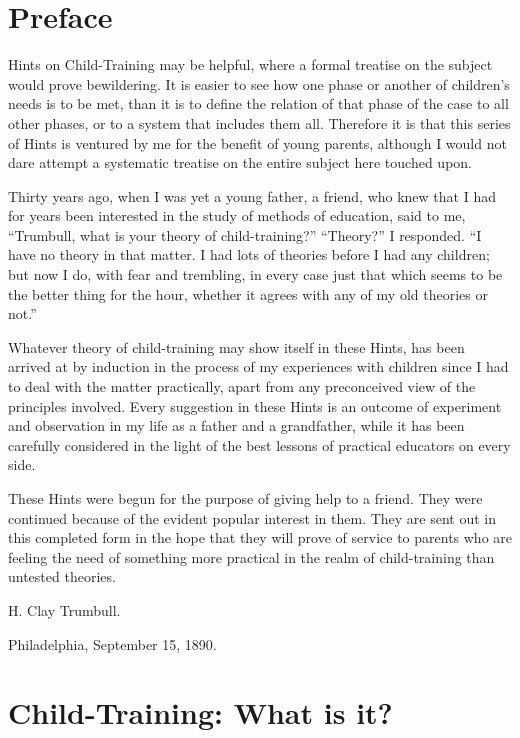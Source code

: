 \documentclass[
]{book}
\begin{document}
\clearpage
\setcounter{page}{1}

\hypertarget{preface}{%
\chapter*{Preface}\label{preface}}

Hints on Child-Training may be helpful, where a formal treatise on the subject would prove bewildering. It is easier to see how one phase or another of children's needs is to be met, than it is to define the relation of that phase of the case to all other phases, or to a system that includes them all. Therefore it is that this series of Hints is ventured by me for the benefit of young parents, although I would not dare attempt a systematic treatise on the entire subject here touched upon.

Thirty years ago, when I was yet a young father, a friend, who knew that I had for years been interested in the study of methods of education, said to me, ``Trumbull, what is your theory of child-training?'' ``Theory?'' I responded. ``I have no theory in that matter. I had lots of theories before I had any children; but now I do, with fear and trembling, in every case just that which seems to be the better thing for the hour, whether it agrees with any of my old theories or not.''

Whatever theory of child-training may show itself in these Hints, has been arrived at by induction in the process of my experiences with children since I had to deal with the matter practically, apart from any preconceived view of the principles involved. Every suggestion in these Hints is an outcome of experiment and observation in my life as a father and a grandfather, while it has been carefully considered in the light of the best lessons of practical educators on every side.

These Hints were begun for the purpose of giving help to a friend. They were continued because of the evident popular interest in them. They are sent out in this completed form in the hope that they will prove of service to parents who are feeling the need of something more practical in the realm of child-training than untested theories.

H. Clay Trumbull.

Philadelphia, September 15, 1890.

\hypertarget{child-training-what-is-it}{%
\chapter{Child-Training: What is it?}\label{child-training-what-is-it}}
\end{document}
